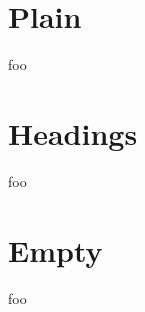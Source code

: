 \documentclass{article}
\begin{document}
\thispagestyle{plain}
\chapter{Plain}
\newpage
foo
\newpage
\thispagestyle{headings}
\chapter{Headings}
\newpage
foo
\newpage
\thispagestyle{empty}
\chapter{Empty}
\newpage
foo
\end{document}
